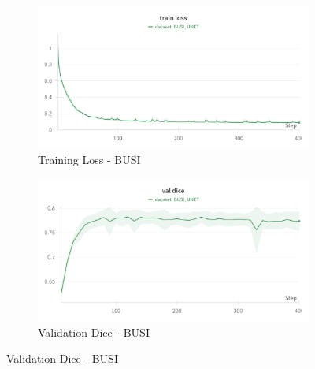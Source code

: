\begin{figure}[h]
    \begin{subfigure}{0.45\textwidth}
        \centering
        \includegraphics[width=\linewidth]{images/unet/busi_train_loss.png}
        \caption{Training Loss - BUSI}
    \end{subfigure}
    \hfill
    \begin{subfigure}{0.45\textwidth}
        \centering
        \includegraphics[width=\linewidth]{images/unet/busi_val_dice.png}
        \caption{Validation Dice - BUSI}
    \end{subfigure}
    

\end{figure}
